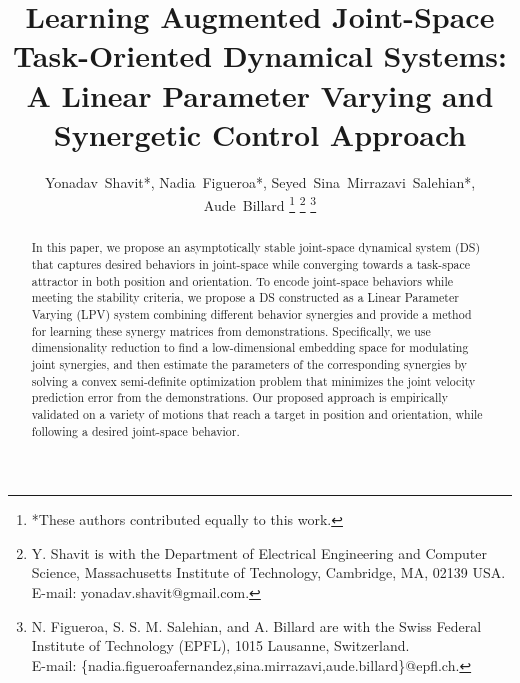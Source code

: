 \documentclass[letterpaper, 10 pt, conference,fleqn]{ieeeconf}
\begin{document}
%
\title{Learning Augmented Joint-Space Task-Oriented Dynamical Systems: \\ A
Linear Parameter Varying and Synergetic Control Approach}


%
%
\author{Yonadav~Shavit*, Nadia~Figueroa*, Seyed~Sina~Mirrazavi~Salehian*, Aude~Billard
\thanks{*These authors contributed equally to this work.}
\thanks{Y. Shavit is with the Department
of Electrical Engineering and Computer Science, Massachusetts Institute of Technology, Cambridge,
MA, 02139 USA. E-mail: yonadav.shavit@gmail.com.}%
\thanks{N. Figueroa, S. S. M. Salehian, and A. Billard are with the Swiss Federal Institute of Technology (EPFL), 1015 Lausanne, Switzerland. \\E-mail: \{nadia.figueroafernandez,sina.mirrazavi,aude.billard\}@epfl.ch.}
}%


\maketitle
\thispagestyle{empty}
\pagestyle{empty}



\begin{abstract}
In this paper, we propose an asymptotically stable joint-space dynamical system (DS) that captures desired behaviors in joint-space while converging towards a task-space attractor in both position and orientation.  To encode joint-space behaviors while meeting the stability criteria, we propose a DS constructed as a Linear Parameter Varying (LPV) system combining different behavior synergies and provide a method for learning these synergy matrices from demonstrations. Specifically, we use dimensionality reduction to find a low-dimensional embedding space for modulating joint synergies, and then estimate the parameters of the corresponding synergies by solving a convex semi-definite optimization problem that minimizes the joint velocity prediction error from the demonstrations. Our proposed approach is empirically validated on a variety of motions that reach a target in position and orientation, while following a desired joint-space behavior.
 \end{abstract}
\end{document}
